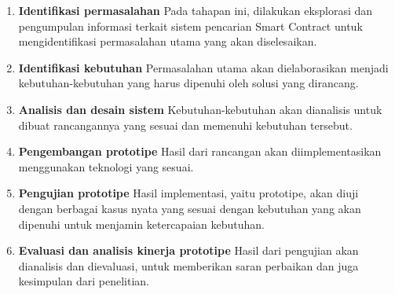 \begin{enumerate}
  \item \textbf{Identifikasi permasalahan} \newline
        Pada tahapan ini, dilakukan eksplorasi dan pengumpulan informasi terkait sistem pencarian Smart Contract untuk mengidentifikasi permasalahan utama yang akan diselesaikan.
  \item \textbf{Identifikasi kebutuhan} \newline
        Permasalahan utama akan dielaborasikan menjadi kebutuhan-kebutuhan yang harus dipenuhi oleh solusi yang dirancang.
  \item \textbf{Analisis dan desain sistem} \newline
        Kebutuhan-kebutuhan akan dianalisis untuk dibuat rancangannya yang sesuai dan memenuhi kebutuhan tersebut.
  \item \textbf{Pengembangan prototipe} \newline
        Hasil dari rancangan akan diimplementasikan menggunakan teknologi yang sesuai.
  \item \textbf{Pengujian prototipe} \newline
        Hasil implementasi, yaitu prototipe, akan diuji dengan berbagai kasus nyata yang sesuai dengan kebutuhan yang akan dipenuhi untuk menjamin ketercapaian kebutuhan.
  \item \textbf{Evaluasi dan analisis kinerja prototipe} \newline
        Hasil dari pengujian akan dianalisis dan dievaluasi, untuk memberikan saran perbaikan dan juga kesimpulan dari penelitian.
\end{enumerate}



